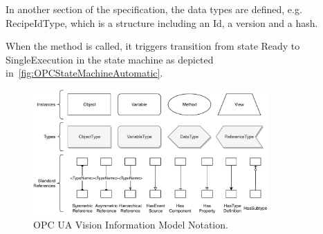 In another section of the specification, the data types are defined, e.g. RecipeIdType, which is a structure including an Id, a version and a hash.

When the method is called, it triggers transition from state Ready to SingleExecution in the state machine as depicted in~\ref{fig:OPCStateMachineAutomatic}.

\begin{figure}[ht]
    \centering
    \includegraphics[width=0.8\textwidth]{img/OPCUAVisionInformationModelNotation.pdf}
    \caption[OPC UA Vision Information Model Notation]{OPC UA Vision Information Model Notation.\cite{VDMA2018OPC40100-1:2018-11}}
    \label{fig:OPCInfoModelNotation}
\end{figure}

